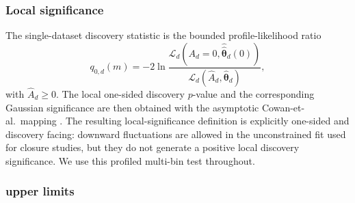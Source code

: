 \subsubsection{Local significance}

The single-dataset discovery statistic is the bounded profile-likelihood ratio
\begin{equation}
q_{0,d}(m) = -2\ln
\frac{\mathcal{L}_d\!\left(A_d=0,\hat{\hat{\bm{\theta}}}_d(0)\right)}
{\mathcal{L}_d\!\left(\hat A_d,\hat{\bm{\theta}}_d\right)},
\label{eq:q0-single}
\end{equation}
with $\hat A_d\ge0$. The local one-sided discovery $p$-value and the corresponding
Gaussian significance are then obtained with the asymptotic Cowan-et-al.\ mapping
\cite{Cowan2011}. The resulting local-significance definition is explicitly
one-sided and discovery facing: downward fluctuations are allowed in the unconstrained
fit used for closure studies, but they do not generate a positive local discovery
significance. We use this profiled multi-bin test throughout.

\subsubsection{\texorpdfstring{\CLs}{CLs} upper limits}

